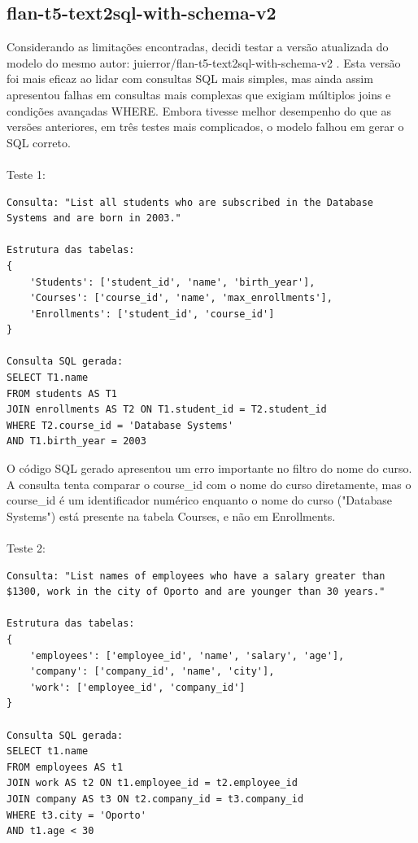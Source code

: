 \documentclass{article}
\begin{document}
\subsection{flan-t5-text2sql-with-schema-v2} 
\hspace*{1em} Considerando as limitações encontradas, decidi testar a versão atualizada do modelo do mesmo autor: juierror/flan-t5-text2sql-with-schema-v2 \cite{juierror2025flan}. Esta versão foi mais eficaz ao lidar com consultas SQL mais simples, mas ainda assim apresentou falhas em consultas mais complexas que exigiam múltiplos joins e condições avançadas WHERE. Embora tivesse melhor desempenho do que as versões anteriores, em três testes mais complicados, o modelo falhou em gerar o SQL correto. 
\\
\\
Teste 1:
\begin{lstlisting}
Consulta: "List all students who are subscribed in the Database Systems and are born in 2003."

Estrutura das tabelas:
{
    'Students': ['student_id', 'name', 'birth_year'],
    'Courses': ['course_id', 'name', 'max_enrollments'],
    'Enrollments': ['student_id', 'course_id']
}

Consulta SQL gerada:
SELECT T1.name 
FROM students AS T1 
JOIN enrollments AS T2 ON T1.student_id = T2.student_id 
WHERE T2.course_id = 'Database Systems' 
AND T1.birth_year = 2003
\end{lstlisting}

O código SQL gerado apresentou um erro importante no filtro do nome do curso. A consulta tenta comparar o course\_id com o nome do curso diretamente, mas o course\_id é um identificador numérico enquanto o nome do curso ("Database Systems") está presente na tabela Courses, e não em Enrollments.
\\
\\
Teste 2:

\begin{lstlisting}
Consulta: "List names of employees who have a salary greater than $1300, work in the city of Oporto and are younger than 30 years."

Estrutura das tabelas:
{ 
    'employees': ['employee_id', 'name', 'salary', 'age'],
    'company': ['company_id', 'name', 'city'], 
    'work': ['employee_id', 'company_id']
}

Consulta SQL gerada:
SELECT t1.name 
FROM employees AS t1 
JOIN work AS t2 ON t1.employee_id = t2.employee_id 
JOIN company AS t3 ON t2.company_id = t3.company_id 
WHERE t3.city = 'Oporto' 
AND t1.age < 30
\end{lstlisting}
\end{document}
